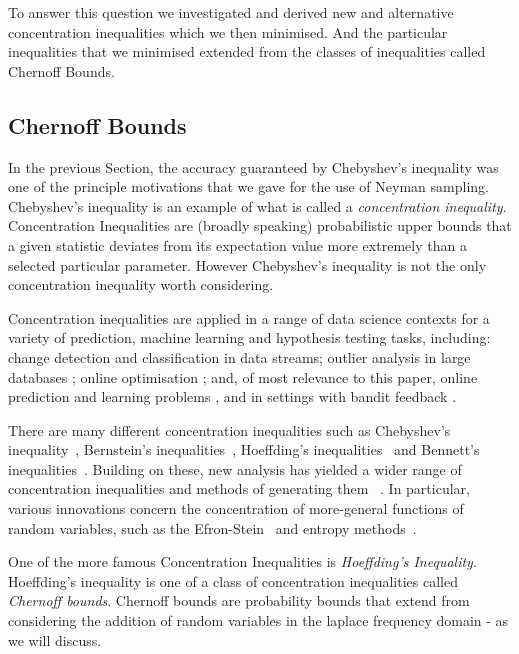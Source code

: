 To answer this question we investigated and derived new and alternative concentration inequalities which we then minimised.  And the particular inequalities that we minimised extended from the classes of inequalities called Chernoff Bounds.

\subsection{Chernoff Bounds}

In the previous Section, the accuracy guaranteed by Chebyshev's inequality was one of the principle motivations that we gave for the use of Neyman sampling.
Chebyshev's inequality is an example of what is called a \textit{concentration inequality}.
Concentration Inequalities are (broadly speaking) probabilistic upper bounds that a given statistic deviates from its expectation value more extremely than a selected particular parameter.
However Chebyshev's inequality is not the only concentration inequality worth considering.

Concentration inequalities are applied in a range of data science contexts for a variety of prediction, machine learning and hypothesis testing tasks, including:
change detection \cite{KiferShaiGehrke2004,8000571} 
and classification \cite{Zia-UrRehman2012} in data streams;
outlier analysis in large databases \cite{Aggarwal2015};
online optimisation \cite{FlaxmanKalaiMcMahan2005,AgarwalDekelXiao2010}; and, of most relevance to this paper, 
online prediction and learning problems \cite{Cesa-BianchiLugosi2006,%
Mnih:2008:EBS:1390156.1390241,DBLP:conf/aaai/ThomasTG15,Maurer50empiricalbernstein},
and in settings with bandit feedback \cite{AuerCesa-BianchiEtal_SIAM2003,AudibertBubeck_COLT2009,Tran-ThanhChapmanRJ_AAAI2009}.

There are many different concentration inequalities such as Chebyshev's inequality~\cite{Chebyshev1}, Bernstein's inequalities~\cite{Burnstein1}, 
Hoeffding's inequalities~\cite{hoeffding1} and Bennett's inequalities~\cite{10.2307/2282438}.
Building on these, new analysis has yielded a wider range of concentration inequalities and methods of generating them ~\cite{MR3363542,Boucheron2004}. 
In particular, various innovations concern the concentration of more-general functions of random variables, such as 
the Efron-Stein~\cite{efron1981} and 
entropy methods~\cite{Boucheron_concentrationinequalities}.%

One of the more famous Concentration Inequalities is \textit{Hoeffding's Inequality}.
Hoeffding's inequality is one of a class of concentration inequalities called \textit{Chernoff bounds}.
Chernoff bounds are probability bounds that extend from considering the addition of random variables in the laplace frequency domain - as we will discuss.


